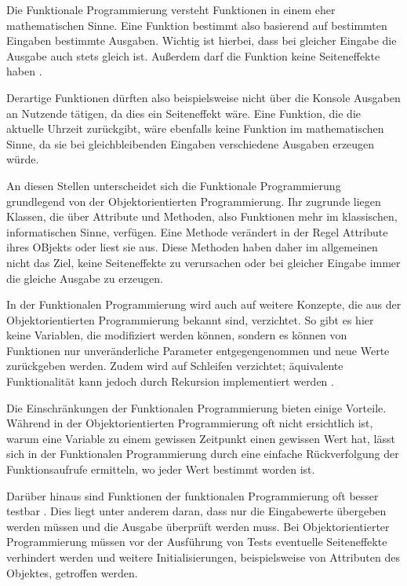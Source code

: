 Die Funktionale Programmierung versteht Funktionen in einem eher mathematischen Sinne. Eine Funktion bestimmt also basierend auf bestimmten Eingaben bestimmte Ausgaben. Wichtig ist hierbei, dass bei gleicher Eingabe die Ausgabe auch stets gleich ist. Außerdem darf die Funktion keine Seiteneffekte haben \cite{hinsen2009functional_programming}.

Derartige Funktionen dürften also beispielsweise nicht über die Konsole Ausgaben an Nutzende tätigen, da dies ein Seiteneffekt wäre. Eine Funktion, die die aktuelle Uhrzeit zurückgibt, wäre ebenfalls keine Funktion im mathematischen Sinne, da sie bei gleichbleibenden Eingaben verschiedene Ausgaben erzeugen würde.

An diesen Stellen unterscheidet sich die Funktionale Programmierung grundlegend von der Objektorientierten Programmierung. Ihr zugrunde liegen Klassen, die über Attribute und Methoden, also Funktionen mehr im klassischen, informatischen Sinne, verfügen. Eine Methode verändert in der Regel Attribute ihres OBjekts oder liest sie aus. Diese Methoden haben daher im allgemeinen nicht das Ziel, keine Seiteneffekte zu verursachen oder bei gleicher Eingabe immer die gleiche Ausgabe zu erzeugen.

In der Funktionalen Programmierung wird auch auf weitere Konzepte, die aus der Objektorientierten Programmierung bekannt sind, verzichtet. So gibt es hier keine Variablen, die modifiziert werden können, sondern es können von Funktionen nur unveränderliche Parameter entgegengenommen und neue Werte zurückgeben werden. Zudem wird auf Schleifen verzichtet; äquivalente Funktionalität kann jedoch durch Rekursion implementiert werden \cite{hinsen2009functional_programming}.

Die Einschränkungen der Funktionalen Programmierung bieten einige Vorteile. Während in der Objektorientierten Programmierung oft nicht ersichtlich ist, warum eine Variable zu einem gewissen Zeitpunkt einen gewissen Wert hat, lässt sich in der Funktionalen Programmierung durch eine einfache Rückverfolgung der Funktionsaufrufe ermitteln, wo jeder Wert bestimmt worden ist.

Darüber hinaus sind Funktionen der funktionalen Programmierung oft besser testbar \cite{hinsen2009functional_programming} \cite{benton2016js_functional}. Dies liegt unter anderem daran, dass nur die Eingabewerte übergeben werden müssen und die Ausgabe überprüft werden muss. Bei Objektorientierter Programmierung müssen vor der Ausführung von Tests eventuelle Seiteneffekte verhindert werden und weitere Initialisierungen, beispielsweise von Attributen des Objektes, getroffen werden.

